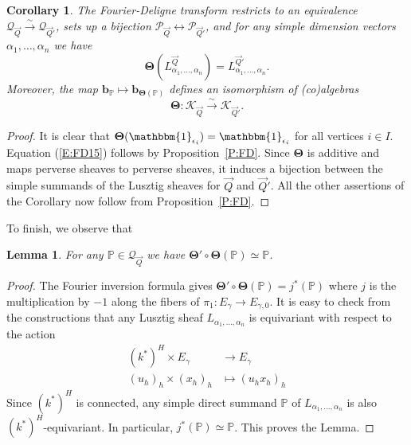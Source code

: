 \documentclass[a4paper,10pt]{amsart}
\def\a{\alpha}
\def\FD{\boldsymbol{\Theta}}
\def\QQ{\mathcal{Q}_{\vec{Q}}}
\newtheorem{lem}[theo]{Lemma}
\newtheorem{cor}[theo]{Corollary}
\numberwithin{equation}{section}
\begin{document}
\begin{cor}\label{C:FD} The Fourier-Deligne transform restricts to an equivalence $\mathcal{Q}_{\vec{Q}} \stackrel{\sim}{\to} \mathcal{Q}_{\vec{Q}'}$, sets up a bijection $\mathcal{P}_{\vec{Q}} \leftrightarrow \mathcal{P}_{\vec{Q}'}$, and for any \textit{simple} dimension vectors $\a_1, \ldots, \a_n$ we have
\begin{equation}\label{E:FD15}
\FD( L^{\vec{Q}}_{\a_1, \ldots, \a_n})=L^{\vec{Q}'}_{\a_1, \ldots, \a_n}.
\end{equation}
Moreover, the map $\mathbf{b}_{\mathbb{P}} \mapsto \mathbf{b}_{\FD(\mathbb{P})}$ defines an isomorphism of (co)algebras 
$$\FD: \mathcal{K}_{\vec{Q}} \stackrel{\sim}{\to} \mathcal{K}_{\vec{Q}'}.$$
\end{cor}
\begin{proof} It is clear that $\FD(\mathbbm{1}_{\epsilon_i}) =\mathbbm{1}_{\epsilon_i}$ for all vertices $i \in I$. Equation (\ref{E:FD15}) follows by Proposition~\ref{P:FD}. Since $\FD$ is additive and maps perverse sheaves to perverse sheaves, it induces a bijection between the simple summands of the Lusztig sheaves for $\vec{Q}$ and $\vec{Q}'$. All the other assertions of the Corollary now follow from Proposition~\ref{P:FD}.\end{proof}

\vspace{.1in}

To finish, we observe that

\vspace{.1in}

\begin{lem} For any $\mathbb{P} \in \QQ$ we have $\FD' \circ \FD (\mathbb{P}) \simeq \mathbb{P}$.
\end{lem}
\begin{proof} The Fourier inversion formula gives $\FD' \circ \FD (\mathbb{P}) = j^*(\mathbb{P})$ where $j$ is the multiplication by $-1$ along the fibers of $\pi_1: E_{\gamma} \to E_{\gamma,0}$.  It is easy to check from the constructions that any Lusztig sheaf $L_{\a_1, \ldots, \a_n}$ is equivariant with respect to the action 
\begin{equation*}
\begin{split}
(k^*)^H \times E_{\gamma} & \to E_{\gamma}\\
(u_h)_h \times (x_h)_h&\mapsto (u_h x_h)_{h}
\end{split}
\end{equation*}
Since $(k^*)^H$ is connected, any simple direct summand $\mathbb{P}$ of $L_{\a_1, \ldots, \a_n}$ is also $(k^*)^H$-equivariant. In particular, $j^*(\mathbb{P}) \simeq \mathbb{P}$. This proves the Lemma.\end{proof}
\end{document}
